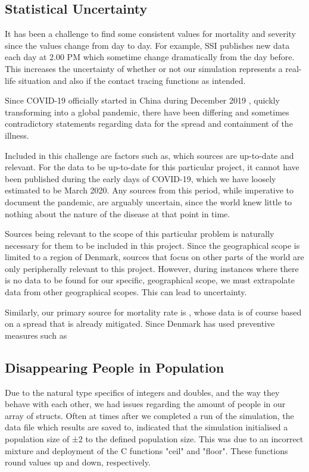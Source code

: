 \subsection{Statistical Uncertainty} \label{sub: Statistical Uncertainty}

It has been a challenge to find some consistent values for mortality and severity since the values change from day to day. For example, SSI publishes new data each day at 2.00 PM which sometime change dramatically from the day before. This increases the uncertainty of whether or not our simulation represents a real-life situation and also if the contact tracing functions as intended.

Since COVID-19 officially started in China during December 2019 \citep{gorbalenya_severe_2020}, quickly transforming into a global pandemic, there have been differing and sometimes contradictory statements regarding data for the spread and containment of the illness. 

Included in this challenge are factors such as, which sources are up-to-date and relevant. For the data to be up-to-date for this particular project, it cannot have been published during the early days of COVID-19, which we have loosely estimated to be March 2020. Any sources from this period, while imperative to document the pandemic, are arguably uncertain, since the world knew little to nothing about the nature of the disease at that point in time.

Sources being relevant to the scope of this particular problem is naturally necessary for them to be included in this project. Since the geographical scope is limited to a region of Denmark, sources that focus on other parts of the world are only peripherally relevant to this project. However, during instances where there is no data to be found for our specific, geographical scope, we must extrapolate data from other geographical scopes. This can lead to uncertainty.

Similarly, our primary source for mortality rate is \cite{ssi_statens_nodate}, whose data is of course based on a spread that is already mitigated. Since Denmark has used preventive measures such as

\subsection{Disappearing People in Population}
Due to the natural type specifics of integers and doubles, and the way they behave with each other, we had issues regarding the amount of people in our array of structs. Often at times after we completed a run of the simulation, the data file which results are saved to, indicated that the simulation initialised a population size of ±2 to the defined population size. This was due to an incorrect mixture and deployment of the C functions "ceil" and "floor". These functions round values up and down, respectively.

